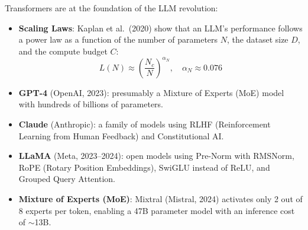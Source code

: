 \begin{sota}[title=\textbf{Large Language Models (LLMs)}]
Transformers are at the foundation of the LLM revolution:

\begin{itemize}
    \item \textbf{Scaling Laws}: Kaplan et al.\ (2020) show that an LLM's performance follows a power law as a function of the number of parameters $N$, the dataset size $D$, and the compute budget $C$:
    \begin{equation}
    L(N) \approx \left(\frac{N_c}{N}\right)^{\alpha_N}, \quad \alpha_N \approx 0.076
    \end{equation}

    \item \textbf{GPT-4} (OpenAI, 2023): presumably a Mixture of Experts (MoE) model with hundreds of billions of parameters.

    \item \textbf{Claude} (Anthropic): a family of models using RLHF (Reinforcement Learning from Human Feedback) and Constitutional AI.

    \item \textbf{LLaMA} (Meta, 2023--2024): open models using Pre-Norm with RMSNorm, RoPE (Rotary Position Embeddings), SwiGLU instead of ReLU, and Grouped Query Attention.

    \item \textbf{Mixture of Experts (MoE)}: Mixtral (Mistral, 2024) activates only 2 out of 8 experts per token, enabling a 47B parameter model with an inference cost of $\sim$13B.
\end{itemize}
\end{sota}

